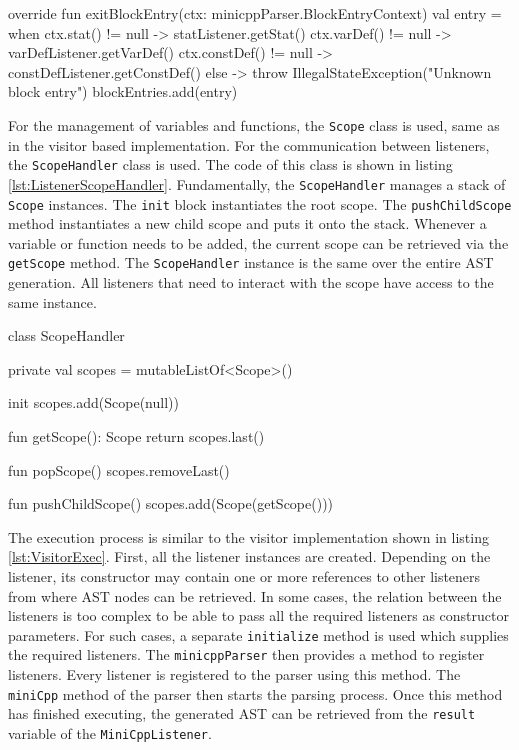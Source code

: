 \begin{KotlinCode}[float,numbers=none,caption=Implementation of the \texttt{exitBlockEntry} method., label=lst:ListenerBlockEntryExit]
override fun exitBlockEntry(ctx: minicppParser.BlockEntryContext) {
    val entry = when {
        ctx.stat() != null     -> statListener.getStat()
        ctx.varDef() != null   -> varDefListener.getVarDef()
        ctx.constDef() != null -> constDefListener.getConstDef()
        else -> throw IllegalStateException("Unknown block entry")
    }
    blockEntries.add(entry)
}
\end{KotlinCode}

For the management of variables and functions, the \verb|Scope| class is used, same as in the visitor based implementation. For the communication between listeners, the \verb|ScopeHandler| class is used. The code of this class is shown in listing \ref{lst:ListenerScopeHandler}. Fundamentally, the \verb|ScopeHandler| manages a stack of \verb|Scope| instances. The \verb|init| block instantiates the root scope. The \verb|pushChildScope| method instantiates a new child scope and puts it onto the stack. Whenever a variable or function needs to be added, the current scope can be retrieved via the \verb|getScope| method. The \verb|ScopeHandler| instance is the same over the entire AST generation. All listeners that need to interact with the scope have access to the same instance. 


\begin{KotlinCode}[float,numbers=none,caption=Implementation of the \texttt{ScopeHandler} class., label=lst:ListenerScopeHandler]
class ScopeHandler {

    private val scopes = mutableListOf<Scope>()

    init {
        scopes.add(Scope(null))
    }

    fun getScope(): Scope {
        return scopes.last()
    }

    fun popScope() {
        scopes.removeLast()
    }

    fun pushChildScope() {
        scopes.add(Scope(getScope()))
    }
}
\end{KotlinCode}

The execution process is similar to the visitor implementation shown in listing \ref{lst:VisitorExec}. First, all the listener instances are created. Depending on the listener, its constructor may contain one or more references to other listeners from where AST nodes can be retrieved. In some cases, the relation between the listeners is too complex to be able to pass all the required listeners as constructor parameters. For such cases, a separate \verb|initialize| method is used which supplies the required listeners. The \verb|minicppParser| then provides a method to register listeners. Every listener is registered to the parser using this method. The \verb|miniCpp| method of the parser then starts the parsing process. Once this method has finished executing, the generated AST can be retrieved from the \verb|result| variable of the \verb|MiniCppListener|.

